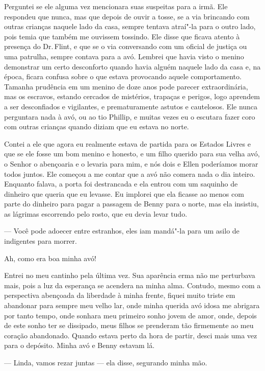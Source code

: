 Perguntei se ele alguma vez mencionara
suas suspeitas para a irmã. Ele respondeu que nunca, mas que depois de
ouvir a tosse, se a via brincando com outras crianças naquele lado da
casa, sempre tentava atraí"-la para o outro lado, pois temia que também
me ouvissem tossindo. Ele disse que ficava atento à presença do Dr.\,Flint, e que se o via conversando com um oficial de justiça ou uma
patrulha, sempre contava para a avó. Lembrei que havia visto o menino
demonstrar um certo desconforto quando havia alguém naquele lado da casa
e, na época, ficara confusa sobre o que estava provocando aquele
comportamento. Tamanha prudência em um menino de doze anos pode parecer
extraordinária, mas os escravos, estando cercados de mistérios, trapaças
e perigos, logo aprendem a ser desconfiados e vigilantes, e
prematuramente astutos e cautelosos. Ele nunca perguntara nada à avó, ou
ao tio Phillip, e muitas vezes eu o escutara fazer coro com outras
crianças quando diziam que eu estava no norte.

Contei a ele que agora eu realmente
estava de partida para os Estados Livres e que se ele fosse um bom
menino e honesto, e um filho querido para sua velha avó, o Senhor o
abençoaria e o levaria para mim, e nós dois e Ellen poderíamos morar
todos juntos. Ele começou a me contar que a avó não comera nada o dia
inteiro. Enquanto falava, a porta foi destrancada e ela entrou com um
saquinho de dinheiro que queria que eu levasse. Eu implorei que ela
ficasse ao menos com parte do dinheiro para pagar a passagem de Benny
para o norte, mas ela insistiu, as lágrimas escorrendo pelo rosto, que
eu devia levar tudo.

--- Você pode adoecer entre estranhos, eles iam mandá"-la para um asilo
de indigentes para morrer.

Ah, como era boa minha avó!

Entrei no meu cantinho pela última vez.
Sua aparência erma não me perturbava mais, pois a luz da esperança se
acendera na minha alma. Contudo, mesmo com a perspectiva abençoada da
liberdade à minha frente, fiquei muito triste em abandonar para sempre
meu velho lar, onde minha querida avó idosa me abrigara por tanto tempo,
onde sonhara meu primeiro sonho jovem de amor, onde, depois de este
sonho ter se dissipado, meus filhos se prenderam tão firmemente ao meu
coração abandonado. Quando estava perto da hora de partir, desci mais
uma vez para o depósito. Minha avó e Benny estavam lá.

--- Linda, vamos rezar juntas --- ela disse, segurando minha mão.

